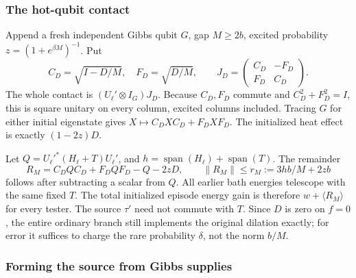 \subsubsection{The hot-qubit contact}
Append a fresh independent Gibbs qubit \(G\), gap \(M\ge2b\), excited
probability \(z=(1+e^{\beta M})^{-1}\). Put
\[
 C_D=\sqrt{I-D/M},\quad F_D=\sqrt{D/M},\qquad
 J_D=\begin{pmatrix}C_D&-F_D\\F_D&C_D\end{pmatrix}.
\]
The whole contact is \((U_\ell'\otimes I_G)J_D\).
Because \(C_D,F_D\) commute and \(C_D^2+F_D^2=I\), this is square
unitary on every column, excited columns included. Tracing \(G\)
for either initial eigenstate gives
\(X\mapsto C_DXC_D+F_DXF_D\). The initialized heat effect is exactly
\((1-2z)D\).

Let \(Q=U_\ell'^*(H_\ell+T)U_\ell'\), and
\(h=\operatorname{span}(H_\ell)+\operatorname{span}(T)\).
The remainder
\[
 R_M=C_DQC_D+F_DQF_D-Q-2zD,\qquad
 \|R_M\|\le r_M:=3hb/M+2zb                            \tag{E11}
\]
follows after subtracting a scalar from \(Q\).
All earlier bath energies telescope with the same fixed \(T\).
The total initialized episode energy gain is therefore
\(w+\langle R_M\rangle\) for every tester.
The source \(\tau'\) need not commute with \(T\).
Since \(D\) is zero on \(f=0\), the entire ordinary branch still
implements the original dilation exactly; for error it suffices
to charge the rare probability \(\delta\), not the norm \(b/M\).

\subsubsection{Forming the source from Gibbs supplies}

